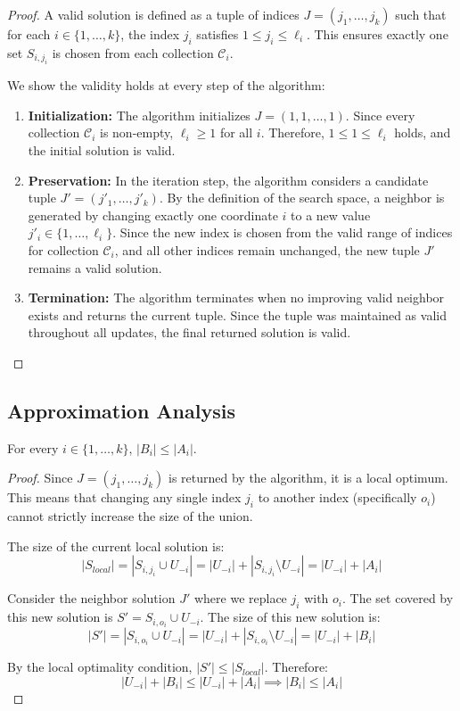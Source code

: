 \begin{proof}
A valid solution is defined as a tuple of indices $J = (j_1, \dots, j_k)$ such that for each $i \in \{1, \dots, k\}$, the index $j_i$ satisfies $1 \le j_i \le \ell_i$. This ensures exactly one set $S_{i, j_i}$ is chosen from each collection $\mathcal{C}_i$.

We show the validity holds at every step of the algorithm:
\begin{enumerate}
    \item \textbf{Initialization:} The algorithm initializes $J = (1, 1, \dots, 1)$. Since every collection $\mathcal{C}_i$ is non-empty, $\ell_i \ge 1$ for all $i$. Therefore, $1 \le 1 \le \ell_i$ holds, and the initial solution is valid.
    \item \textbf{Preservation:} In the iteration step, the algorithm considers a candidate tuple $J' = (j'_1, \dots, j'_k)$. By the definition of the search space, a neighbor is generated by changing exactly one coordinate $i$ to a new value $j'_i \in \{1, \dots, \ell_i\}$. Since the new index is chosen from the valid range of indices for collection $\mathcal{C}_i$, and all other indices remain unchanged, the new tuple $J'$ remains a valid solution.
    \item \textbf{Termination:} The algorithm terminates when no improving valid neighbor exists and returns the current tuple. Since the tuple was maintained as valid throughout all updates, the final returned solution is valid.
\end{enumerate}
\end{proof}

\subsection*{Approximation Analysis}

\begin{lemma} \label{lemma:local_opt}
For every $i \in \{1, \dots, k\}$, $|B_i| \le |A_i|$.
\end{lemma}

\begin{proof}
Since $J = (j_1, \dots, j_k)$ is returned by the algorithm, it is a local optimum. This means that changing any single index $j_i$ to another index (specifically $o_i$) cannot strictly increase the size of the union.

The size of the current local solution is:
\[ |S_{local}| = |S_{i, j_i} \cup U_{-i}| = |U_{-i}| + |S_{i, j_i} \setminus U_{-i}| = |U_{-i}| + |A_i| \]

Consider the neighbor solution $J'$ where we replace $j_i$ with $o_i$. The set covered by this new solution is $S' = S_{i, o_i} \cup U_{-i}$. The size of this new solution is:
\[ |S'| = |S_{i, o_i} \cup U_{-i}| = |U_{-i}| + |S_{i, o_i} \setminus U_{-i}| = |U_{-i}| + |B_i| \]

By the local optimality condition, $|S'| \le |S_{local}|$. Therefore:
\[ |U_{-i}| + |B_i| \le |U_{-i}| + |A_i| \implies |B_i| \le |A_i| \]
\end{proof}

